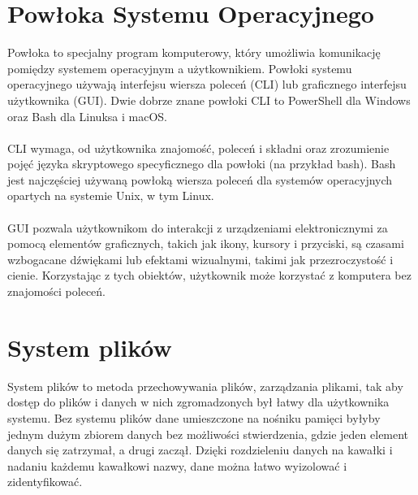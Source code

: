 \documentclass[10pt,a4paper]{report}
\begin{document}
\begin{adjustwidth}{2cm}{2cm}
\section{Powłoka Systemu Operacyjnego}
\begin{minipage}{1\linewidth}
Powłoka to specjalny program komputerowy, który umożliwia komunikację pomiędzy systemem operacyjnym a użytkownikiem. Powłoki systemu operacyjnego używają interfejsu wiersza poleceń (CLI) lub graficznego interfejsu użytkownika (GUI). Dwie dobrze znane powłoki CLI to PowerShell dla Windows oraz Bash dla Linuksa i macOS. \\ \\
CLI wymaga, od użytkownika znajomość, poleceń i składni oraz zrozumienie pojęć języka skryptowego specyficznego dla powłoki (na przykład bash). Bash jest najczęściej używaną powłoką wiersza poleceń dla systemów operacyjnych opartych na systemie Unix, w tym Linux. \\ \\
GUI pozwala użytkownikom do interakcji z urządzeniami elektronicznymi za pomocą elementów graficznych, takich jak ikony, kursory i przyciski, są czasami wzbogacane dźwiękami lub efektami wizualnymi, takimi jak przezroczystość i cienie. Korzystając z tych obiektów, użytkownik może korzystać z komputera bez znajomości poleceń.
\end{minipage}
\section{System plików}
\begin{minipage}{1\linewidth}
System plików to metoda przechowywania plików, zarządzania plikami, tak aby dostęp do plików i danych w nich zgromadzonych był łatwy dla użytkownika systemu. Bez systemu plików dane umieszczone na nośniku pamięci byłyby jednym dużym zbiorem danych bez możliwości stwierdzenia, gdzie jeden element danych się zatrzymał, a drugi zaczął. Dzięki rozdzieleniu danych na kawałki i nadaniu każdemu kawałkowi nazwy, dane można łatwo wyizolować i zidentyfikować. 
\end{minipage}

\end{adjustwidth}
\end{document}
